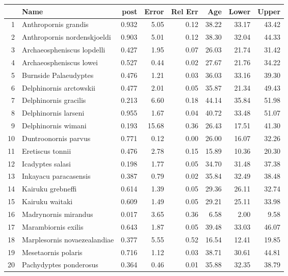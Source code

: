 \documentclass[11pt]{article}
\begin{document}
\begin{table}[ht]
\centering
\begin{tabular}{rlrrrrrr}
  \hline
 & Name & post & Error & Rel Err & Age & Lower & Upper \\ 
  \hline
1 & Anthropornis grandis & 0.932 & 5.05 & 0.12 & 38.22 & 33.17 & 43.42 \\ 
  2 & Anthropornis nordenskjoeldi & 0.903 & 5.01 & 0.12 & 38.30 & 32.04 & 44.33 \\ 
  3 & Archaeospheniscus lopdelli & 0.427 & 1.95 & 0.07 & 26.03 & 21.74 & 31.42 \\ 
  4 & Archaeospheniscus lowei & 0.527 & 0.44 & 0.02 & 27.67 & 21.76 & 34.22 \\ 
  5 & Burnside Palaeudyptes & 0.476 & 1.21 & 0.03 & 36.03 & 33.16 & 39.30 \\ 
  6 & Delphinornis arctowskii & 0.477 & 2.01 & 0.05 & 35.87 & 21.34 & 49.43 \\ 
  7 & Delphinornis gracilis & 0.213 & 6.60 & 0.18 & 44.14 & 35.84 & 51.98 \\ 
  8 & Delphinornis larseni & 0.955 & 1.67 & 0.04 & 40.72 & 33.48 & 51.07 \\ 
  9 & Delphinornis wimani & 0.193 & 15.68 & 0.36 & 26.43 & 17.51 & 41.30 \\ 
  10 & Duntroonornis parvus & 0.771 & 0.12 & 0.00 & 26.00 & 16.07 & 32.26 \\ 
  11 & Eretiscus tonnii & 0.476 & 2.78 & 0.15 & 15.89 & 10.36 & 20.30 \\ 
  12 & Icadyptes salasi & 0.198 & 1.77 & 0.05 & 34.70 & 31.48 & 37.38 \\ 
  13 & Inkayacu paracasensis & 0.387 & 0.79 & 0.02 & 35.84 & 32.49 & 38.48 \\ 
  14 & Kairuku grebneffi & 0.614 & 1.39 & 0.05 & 29.36 & 26.11 & 32.74 \\ 
  15 & Kairuku waitaki & 0.609 & 1.49 & 0.05 & 29.21 & 25.11 & 33.98 \\ 
  16 & Madrynornis mirandus & 0.017 & 3.65 & 0.36 & 6.58 & 2.00 & 9.58 \\ 
  17 & Marambiornis exilis & 0.643 & 1.87 & 0.05 & 39.48 & 33.03 & 46.07 \\ 
  18 & Marplesornis novaezealandiae & 0.377 & 5.55 & 0.52 & 16.54 & 12.41 & 19.85 \\ 
  19 & Mesetaornis polaris & 0.716 & 1.12 & 0.03 & 38.71 & 30.61 & 44.81 \\ 
  20 & Pachydyptes ponderosus & 0.364 & 0.46 & 0.01 & 35.88 & 32.35 & 38.79 \\ 

\end{tabular}
\end{table}
\end{document}
